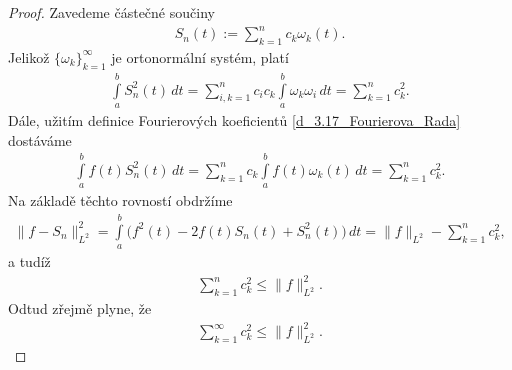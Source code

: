 \begin{proof}
Zavedeme částečné součiny
\begin{align*}
S_n(t) := \sum \limits _{k=1}^n c_k \omega_k(t). 
\end{align*}
Jelikož $\{ \omega_k \}_{k=1}^{\infty}$ je ortonormální systém, platí
\begin{align*}
\int \limits_a^b S_n^2 (t) \, dt = \sum \limits _{i,k=1}^n c_i c_k \int \limits_a^b \omega_k \omega_i  \, dt = \sum \limits _{k=1}^n c_k^2.
\end{align*}
Dále, užitím definice Fourierových koeficient\r u \ref{d_3.17_Fourierova_Rada} dostáváme
\begin{align*}
\int \limits_a^b f(t) S_n^2 (t) \, dt = \sum \limits _{k=1}^n c_k \int \limits_a^b f(t) \omega_k (t) \, dt = \sum \limits _{k=1}^n c_k^2.
\end{align*}
Na základě těchto rovností obdržíme
\begin{align}\label{3.4}
\| f-S_n \|_{L^2}^2= \int \limits_a^b \Big(f^2(t) - 2 f(t)S_n(t) + S_n^2(t)\Big) \, dt = \| f \|_{L^2} - \sum \limits _{k=1}^n c_k^2,
\end{align}
a tudíž
\begin{align*}
\sum \limits _{k=1}^n c_k^2 \leq \|f\|_{L^2}^2.
\end{align*}
Odtud zřejmě plyne, že
\begin{align*}
\sum \limits _{k=1}^{\infty} c_k^2 \leq \|f\|_{L^2}^2.
\end{align*}
\end{proof}


